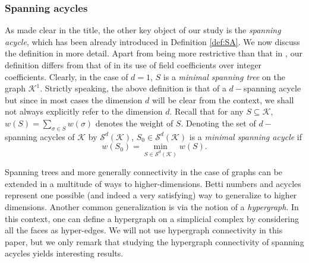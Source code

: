 \documentclass[12pt]{amsart}
\newcommand{\red}[1]{\textcolor{red}{#1}}
\newcommand{\dy}[1]{\textcolor{magenta}{#1}}
\newcommand{\remove}[1]{}
\renewcommand{\red}[1]{#1}
\renewcommand{\dy}[1]{#1}
\newtheorem{remark}[theorem]{Remark}
\numberwithin{equation}{section}
\numberwithin{theorem}{section}
\newcommand{\1}{\mathbf{1}}
\def\F{\mathcal{F}}
\def\K{\mathcal{K}}
\def\S{\mathcal{S}}
\begin{document}
\subsubsection{Spanning acycles}
\label{sec:sp_acycle}

As made clear in the title, the other key object of our study is the {\em spanning acycle}, which has been already introduced in Definition \ref{def:SA}. We now discuss the definition in more detail. Apart from being more restrictive than that in \cite{hiraoka2015minimum,kalai1983enumeration}, our definition differs from that of \cite{hiraoka2015minimum} in its use of field coefficients over integer coefficients. Clearly, in the case of $d = 1$, $S$ is a {\em minimal spanning tree} on the graph $\K^1$. Strictly speaking, the above definition is that of a $d-$spanning acycle but since in most cases the dimension $d$ will be clear from the context, we shall not \dy{always} explicitly refer to the dimension $d$. Recall that for any $S \subseteq \K$, $w(S) = \sum_{\sigma \in S} w(\sigma)$ denotes the weight of $S$. Denoting the set of $d-$spanning acycles of $\K$ by $\S^d(\K)$, $S_0 \in \S^d(\K)$ is a {\em minimal spanning acycle} if
%
\begin{equation}
\label{defn:MSA}
w(S_0) = \min_{S \in \S^d(\K)}w(S).
\end{equation}
%
\remove{	\begin{remark}
\label{rem:SubsetWeights}
Let $\K$ be a simplicial complex with $S_1, S_2 \subset \F^d.$ Henceforth, unless stated otherwise, when we say $w(S_1) < w(S_2),$ we mean it in the spirit of Remark~\ref{rem:uniqueness}, i.e., the inequality is after the tie-breaking rule has been applied. Inequalities between other quantities retain the usual meaning.
\end{remark}
}
Spanning trees and more generally connectivity in the case of graphs can be extended in a multitude of ways to higher-dimensions. Betti numbers and acycles represent one possible (and indeed a very satisfying) way to generalize to higher dimensions. Another common generalization is via the notion of a {\em hypergraph}. In this context, one can define a hypergraph on a simplicial complex by  considering all the faces as hyper-edges. \red{We will not use hypergraph connectivity in this paper, but we only remark that studying the hypergraph connectivity of spanning acycles yields interesting results. }%
\end{document}
